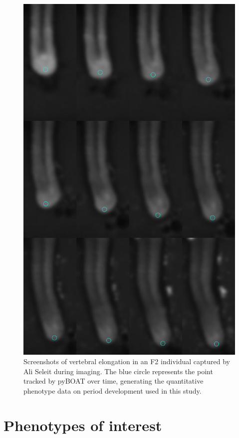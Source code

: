\documentclass[
]{book}
\begin{document}
\begin{figure}
\includegraphics[width=1\linewidth]{figs/somites/ali_compiled_somite_elong} \caption{Screenshots of vertebral elongation in an F2 individual captured by Ali Seleit during imaging. The blue circle represents the point tracked by pyBOAT over time, generating the quantitative phenotype data on period development used in this study.}\label{fig:somite-period-ali}
\end{figure}

\hypertarget{somite-phenotype}{%
\section{Phenotypes of interest}\label{somite-phenotype}}
\end{document}
